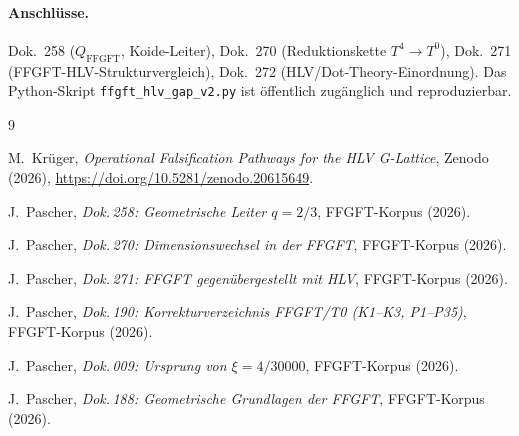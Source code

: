 \paragraph{Anschlüsse.}
Dok.~258 ($Q_\mathrm{FFGFT}$, Koide-Leiter), Dok.~270 (Reduktionskette
$T^4\to T^0$), Dok.~271 (FFGFT-HLV-Strukturvergleich), Dok.~272
(HLV/Dot-Theory-Einordnung). Das Python-Skript
\texttt{ffgft\_hlv\_gap\_v2.py} ist öffentlich zugänglich und reproduzierbar.

\begin{thebibliography}{9}

M.~Krüger,
\emph{Operational Falsification Pathways for the HLV G-Lattice},
Zenodo (2026),
\url{https://doi.org/10.5281/zenodo.20615649}.

J.~Pascher, \emph{Dok.\,258: Geometrische Leiter $q=2/3$},
FFGFT-Korpus (2026).

J.~Pascher, \emph{Dok.\,270: Dimensionswechsel in der FFGFT},
FFGFT-Korpus (2026).

J.~Pascher, \emph{Dok.\,271: FFGFT gegenübergestellt mit HLV},
FFGFT-Korpus (2026).

J.~Pascher, \emph{Dok.\,190: Korrekturverzeichnis FFGFT/T0
(K1--K3, P1--P35)}, FFGFT-Korpus (2026).

J.~Pascher, \emph{Dok.\,009: Ursprung von $\xi = 4/30000$},
FFGFT-Korpus (2026).

J.~Pascher, \emph{Dok.\,188: Geometrische Grundlagen der FFGFT},
FFGFT-Korpus (2026).

\end{thebibliography}
